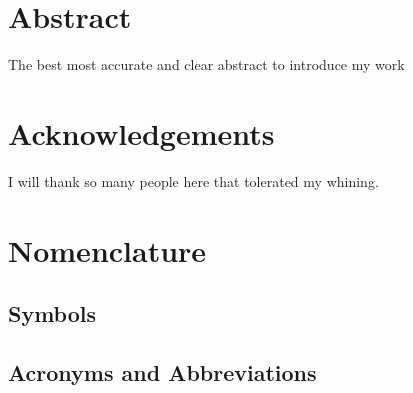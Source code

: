 
\chapter*{Abstract}

The best most accurate and clear abstract to introduce my work

 \newpage
 
 \chapter*{Acknowledgements}

 I will thank so many people here that tolerated my whining.

 \newpage


 \setcounter{tocdepth}{2}
 \tableofcontents

 \newpage


\chapter*{Nomenclature}\label{chap:symbole}

\section*{Symbols}


\section*{Acronyms and Abbreviations}



 \newpage

